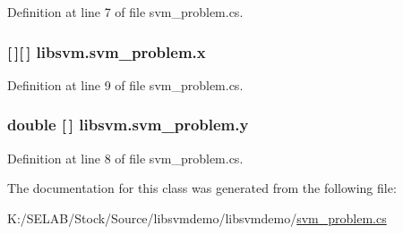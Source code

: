 Definition at line 7 of file svm\_\-problem.cs.

\hypertarget{classlibsvm_1_1svm__problem_ab551d9238bf36c4ba83c018569b09fbb}{
\subsubsection[{x}]{ \mbox{[}$\,$\mbox{]}\mbox{[}$\,$\mbox{]} {\bf libsvm.svm\_\-problem.x}}}
\label{classlibsvm_1_1svm__problem_ab551d9238bf36c4ba83c018569b09fbb}


Definition at line 9 of file svm\_\-problem.cs.

\hypertarget{classlibsvm_1_1svm__problem_affe2ee311a71216facc4f22c9ebae0d3}{
\subsubsection[{y}]{\setlength{\rightskip}{0pt plus 5cm}double \mbox{[}$\,$\mbox{]} {\bf libsvm.svm\_\-problem.y}}}
\label{classlibsvm_1_1svm__problem_affe2ee311a71216facc4f22c9ebae0d3}


Definition at line 8 of file svm\_\-problem.cs.



The documentation for this class was generated from the following file:\begin{DoxyCompactItemize}
\item 
K:/SELAB/Stock/Source/libsvmdemo/libsvmdemo/\hyperlink{svm__problem_8cs}{svm\_\-problem.cs}\end{DoxyCompactItemize}
